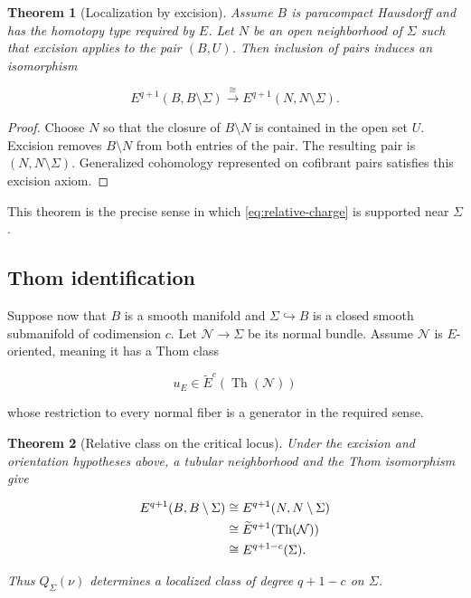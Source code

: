 \documentclass[12pt]{article}
\newtheorem{theorem}{Theorem}[section]
\theoremstyle{definition}
\theoremstyle{remark}
\newcommand{\Th}{\operatorname{Th}}
\begin{document}
\begin{theorem}[Localization by excision]
\label{thm:excision}
Assume $B$ is paracompact Hausdorff and has the homotopy type required by
$E$.  Let $N$ be an open neighborhood of $\Sigma$ such that excision applies
to the pair $(B,U)$.  Then inclusion of pairs induces an isomorphism

\begin{equation}
  E^{q+1}(B,B\setminus\Sigma)
  \xrightarrow{\cong}
  E^{q+1}(N,N\setminus\Sigma).
  \label{eq:excision-isomorphism}
\end{equation}
\end{theorem}

\begin{proof}
Choose $N$ so that the closure of $B\setminus N$ is contained in the open
set $U$.  Excision removes $B\setminus N$ from both entries of the pair.
The resulting pair is $(N,N\setminus\Sigma)$.  Generalized cohomology
represented on cofibrant pairs satisfies this excision axiom.
\end{proof}

This theorem is the precise sense in which \cref{eq:relative-charge} is
supported near $\Sigma$.

\subsection{Thom identification}

Suppose now that $B$ is a smooth manifold and $\Sigma\hookrightarrow B$ is a
closed smooth submanifold of codimension $c$.  Let $\mathcal N\to\Sigma$ be
its normal bundle.  Assume $\mathcal N$ is $E$-oriented, meaning it has a
Thom class

\begin{equation}
  u_E\in\widetilde E^c(\Th(\mathcal N))
\end{equation}

whose restriction to every normal fiber is a generator in the required
sense.

\begin{theorem}[Relative class on the critical locus]
\label{thm:thom-charge}
Under the excision and orientation hypotheses above, a tubular neighborhood
and the Thom isomorphism give

\begin{align}
E^{q+1}(B,B\setminus\Sigma)
&\cong E^{q+1}(N,N\setminus\Sigma) \notag\\
&\cong \widetilde E^{q+1}(\Th(\mathcal N)) \notag\\
&\cong E^{q+1-c}(\Sigma).
\label{eq:thom-localization}
\end{align}

Thus $Q_\Sigma(\nu)$ determines a localized class of degree $q+1-c$ on
$\Sigma$.
\end{theorem}
\end{document}
